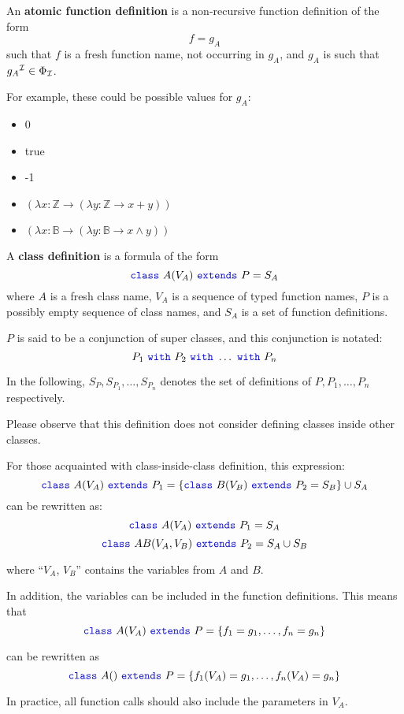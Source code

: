 An \textbf{atomic function definition} is a non-recursive function definition of the form
\[f = g_{A}\]
such that $f$ is a fresh function name, not occurring in $g_{A}$, and $g_{A}$ is such that ${g_{A}}^{\mathcal{I}} \in \Phi _{\mathcal{I}}$.

For example, these could be possible values for $g_{A}$:
\begin{itemize}
    \item 0
    \item true
    \item -1
    \item $(\lambda x: \mathbb{Z} \to (\lambda y: \mathbb{Z} \to x + y))$
    \item $(\lambda x: \mathbb{B} \to (\lambda y: \mathbb{B} \to x \land y) )$
\end{itemize}

A \textbf{class definition} is a formula of the form
\[\sodaclass\ A (V_{A}) \ \sodaextends\ P = S_{A}\]
where $A$ is a fresh class name, $V_{A}$ is a sequence of typed function names, $P$ is a possibly empty sequence of class names, and $S_{A}$ is a set of function definitions.

$P$ is said to be a conjunction of super classes, and this conjunction is notated:
\[P_{1} \ \sodawith\ P_{2} \ \sodawith\ \ldots \ \sodawith\ P_{n}\]

In the following, $S_{P}, S_{P_{1}}, \ldots , S_{P_{n}}$ denotes the set of definitions of $P, P_{1}, \ldots, P_{n}$ respectively.

Please observe that this definition does not consider defining classes inside other classes.

For those acquainted with class-inside-class definition, this expression:
\[\sodaclass\ A (V_{A}) \ \sodaextends\ P_{1} = \{
\sodaclass\ B (V_{B}) \ \sodaextends\ P_{2} = S_{B} \} \cup S_{A}
\]
can be rewritten as:
\[\sodaclass\ A (V_{A}) \ \sodaextends\ P_{1} = S_{A}
\]
\[\sodaclass\ AB (V_{A}, V_{B}) \ \sodaextends\ P_{2} = S_{A} \cup S_{B}
\]

where ``$V_{A}$, $V_{B}$'' contains the variables from $A$ and $B$.

In addition, the variables can be included in the function definitions.
This means that
\[\sodaclass\ A (V_{A}) \ \sodaextends\ P = \{
f_{1} = g_{1},
\ldots ,
f_{n} = g_{n}
\}
\]

can be rewritten as
\[\sodaclass\ A() \ \sodaextends\ P = \{
f_{1}(V_{A}) = g_{1},
\ldots ,
f_{n}(V_{A}) = g_{n}
\}
\]

In practice, all function calls should also include the parameters in $V_{A}$.


